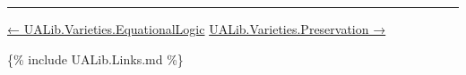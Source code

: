 \begin{code}
\AgdaSymbol{:}\AgdaSpace{}%
\AgdaSpace{}%
\AgdaSymbol{(}\AgdaSpace{}%
\AgdaSymbol{)}\AgdaSpace{}%
\AgdaSymbol{(}\AgdaSpace{}%
\AgdaSymbol{)}\<%
\\
\>[1][@{}l@{\AgdaIndent{0}}]%
\>[2]%
\>[21]\AgdaSpace{}%
\AgdaSymbol{(}\AgdaSymbol{\{}\AgdaSymbol{\}\{}\AgdaSymbol{\}}\AgdaSpace{}%
\AgdaSymbol{)}\AgdaSpace{}%
\AgdaSpace{}%
\AgdaSymbol{(}\AgdaSymbol{\{}\AgdaSpace{}%
\AgdaSymbol{\}\{}\AgdaSpace{}%
\AgdaSymbol{\}}\AgdaSpace{}%
\AgdaSymbol{(}\AgdaSymbol{\{}\AgdaSymbol{\}\{}\AgdaSpace{}%
\AgdaSymbol{\}}\AgdaSpace{}%
\AgdaSymbol{))}\<%
\\
%
\\[\AgdaEmptyExtraSkip]%
%
\>[1]\AgdaSpace{}%
\AgdaSpace{}%
\AgdaSymbol{=}\AgdaSpace{}%
\AgdaSymbol{\{}\AgdaSpace{}%
\AgdaSymbol{=}\AgdaSpace{}%
\AgdaSymbol{\}}\AgdaSpace{}%
\AgdaSymbol{(}\AgdaSymbol{)}\<%
\\
\>[0]\<%
\end{code}

\begin{center}\rule{0.5\linewidth}{\linethickness}\end{center}

\href{UALib.Varieties.EquationalLogic.html}{←
UALib.Varieties.EquationalLogic}
{\href{UALib.Varieties.Preservation.html}{UALib.Varieties.Preservation
→}}

\{\% include UALib.Links.md \%\}

